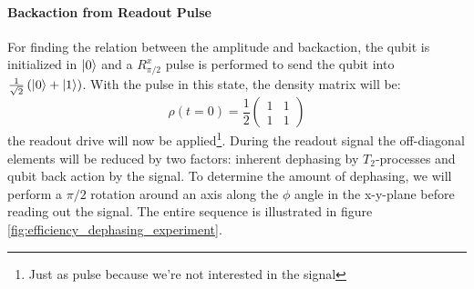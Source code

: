 \paragraph{Backaction from Readout Pulse}
For finding the relation between the amplitude and backaction, the qubit is initialized in $\ket{0}$ and a $R^x_{\pi/2}$ pulse is performed to send the qubit into $\frac{1}{\sqrt{2}}\left(\ket{0} + \ket{1}\right)$. With the pulse in this state, the density matrix will be:
\begin{equation}
    \rho(t=0) = \frac12 \begin{pmatrix}1 & 1 \\ 1 & 1\end{pmatrix}
\end{equation}
the readout drive will now be applied\footnote{Just as pulse because we're not interested in the signal}. During the readout signal the off-diagonal elements will be reduced by two factors: inherent dephasing by $T_2$-processes and qubit back action by the signal. To determine the amount of dephasing, we will perform a $\pi/2$ rotation around an axis along the $\phi$ angle in the x-y-plane before reading out the signal. The entire sequence is illustrated in figure \ref{fig:efficiency_dephasing_experiment}.

